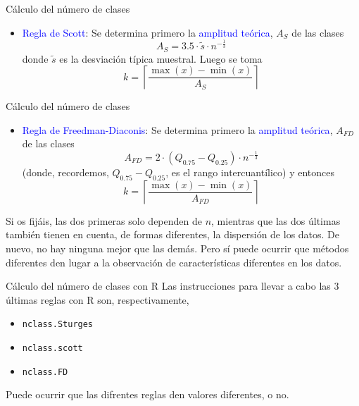 \documentclass[
  ignorenonframetext,
]{beamer}
\providecommand{\tightlist}{%
  \setlength{\itemsep}{0pt}\setlength{\parskip}{0pt}}
\newcommand\blue[1]{\textcolor{blue}{#1}}
\begin{document}
\begin{frame}{Cálculo del número de clases}
\label{cuxe1lculo-del-nuxfamero-de-clases-1}
\begin{itemize}
\tightlist
\item
  \blue{Regla de Scott}: Se determina primero la
  \blue{amplitud teórica}, \(A_S\) de las clases
  \[A_S = 3.5\cdot\tilde{s}\cdot n^{-\frac{1}{3}}\] donde \(\tilde{s}\)
  es la desviación típica muestral. Luego se toma
  \[k = \left\lceil \frac{\max(x)-\min(x)}{A_S}\right\rceil\]
\end{itemize}
\end{frame}

\begin{frame}{Cálculo del número de clases}
\label{cuxe1lculo-del-nuxfamero-de-clases-2}
\begin{itemize}
\tightlist
\item
  \blue{Regla de Freedman-Diaconis}: Se determina primero la
  \blue{amplitud teórica}, \(A_{FD}\) de las clases
  \[A_{FD} = 2\cdot(Q_{0.75}-Q_{0.25})\cdot n^{-\frac{1}{3}}\] (donde,
  recordemos, \(Q_{0.75}-Q_{0.25}\), es el rango intercuantílico) y
  entonces
  \[k = \left\lceil \frac{\max(x)-\min(x)}{A_{FD}}\right\rceil\]
\end{itemize}

Si os fijáis, las dos primeras solo dependen de \(n\), mientras que las
dos últimas también tienen en cuenta, de formas diferentes, la
dispersión de los datos. De nuevo, no hay ninguna mejor que las demás.
Pero sí puede ocurrir que métodos diferentes den lugar a la observación
de características diferentes en los datos.
\end{frame}

\begin{frame}[fragile]{Cálculo del número de clases con R}
\label{cuxe1lculo-del-nuxfamero-de-clases-con-r}
Las instrucciones para llevar a cabo las 3 últimas reglas con R son,
respectivamente,

\begin{itemize}
\tightlist
\item
  \texttt{nclass.Sturges}
\item
  \texttt{nclass.scott}
\item
  \texttt{nclass.FD}
\end{itemize}

Puede ocurrir que las difrentes reglas den valores diferentes, o no.
\end{frame}
\end{document}
